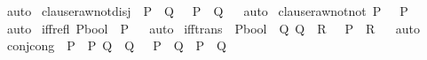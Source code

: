 \begin{isabellebody}
\ auto%
\endisatagproof
{\isafoldproof}%
%
\isadelimproof
%
\endisadelimproof
\isanewline
{}\isamarkupfalse%
\ clause{}raw{\isacharunderscore}{\kern0pt}not{\isacharunderscore}{\kern0pt}disj{\isacharcolon}{\kern0pt}\ {\isachardoublequoteopen}{\isasymlbrakk}{\isasymnot}\ P{\isacharsemicolon}{\kern0pt}\ {\isasymnot}\ Q{\isasymrbrakk}\ {\isasymLongrightarrow}\ {\isasymnot}\ {\isacharparenleft}{\kern0pt}P\ {\isasymor}\ Q{\isacharparenright}{\kern0pt}{\isachardoublequoteclose}%
\isadelimproof
\ %
\endisadelimproof
%
\isatagproof
{}\isamarkupfalse%
\ auto%
\endisatagproof
{\isafoldproof}%
%
\isadelimproof
%
\endisadelimproof
\isanewline
{}\isamarkupfalse%
\ clause{}raw{\isacharunderscore}{\kern0pt}not{\isacharunderscore}{\kern0pt}not{\isacharcolon}{\kern0pt}\ {\isachardoublequoteopen}P\ {\isasymLongrightarrow}\ {\isasymnot}{\isasymnot}\ P{\isachardoublequoteclose}%
\isadelimproof
\ %
\endisadelimproof
%
\isatagproof
{}\isamarkupfalse%
\ auto%
\endisatagproof
{\isafoldproof}%
%
\isadelimproof
%
\endisadelimproof
\isanewline
\isanewline
{}\isamarkupfalse%
\ iff{\isacharunderscore}{\kern0pt}refl{\isacharcolon}{\kern0pt}\ {\isachardoublequoteopen}{\isacharparenleft}{\kern0pt}P{\isacharcolon}{\kern0pt}{\isacharcolon}{\kern0pt}bool{\isacharparenright}{\kern0pt}\ {\isacharequal}{\kern0pt}\ P{\isachardoublequoteclose}%
\isadelimproof
\ %
\endisadelimproof
%
\isatagproof
{}\isamarkupfalse%
\ auto%
\endisatagproof
{\isafoldproof}%
%
\isadelimproof
%
\endisadelimproof
\isanewline
{}\isamarkupfalse%
\ iff{\isacharunderscore}{\kern0pt}trans{\isacharcolon}{\kern0pt}\ {\isachardoublequoteopen}{\isacharbrackleft}{\kern0pt}{\isacharbar}{\kern0pt}\ {\isacharparenleft}{\kern0pt}P{\isacharcolon}{\kern0pt}{\isacharcolon}{\kern0pt}bool{\isacharparenright}{\kern0pt}\ {\isacharequal}{\kern0pt}\ Q{\isacharsemicolon}{\kern0pt}\ Q\ {\isacharequal}{\kern0pt}\ R\ {\isacharbar}{\kern0pt}{\isacharbrackright}{\kern0pt}\ {\isacharequal}{\kern0pt}{\isacharequal}{\kern0pt}{\isachargreater}{\kern0pt}\ P\ {\isacharequal}{\kern0pt}\ R{\isachardoublequoteclose}%
\isadelimproof
\ %
\endisadelimproof
%
\isatagproof
{}\isamarkupfalse%
\ auto%
\endisatagproof
{\isafoldproof}%
%
\isadelimproof
%
\endisadelimproof
\isanewline
{}\isamarkupfalse%
\ conj{\isacharunderscore}{\kern0pt}cong{\isacharcolon}{\kern0pt}\ {\isachardoublequoteopen}{\isacharbrackleft}{\kern0pt}{\isacharbar}{\kern0pt}\ P\ {\isacharequal}{\kern0pt}\ P{\isacharprime}{\kern0pt}{\isacharsemicolon}{\kern0pt}\ Q\ {\isacharequal}{\kern0pt}\ Q{\isacharprime}{\kern0pt}\ {\isacharbar}{\kern0pt}{\isacharbrackright}{\kern0pt}\ {\isacharequal}{\kern0pt}{\isacharequal}{\kern0pt}{\isachargreater}{\kern0pt}\ {\isacharparenleft}{\kern0pt}P\ {\isasymand}\ Q{\isacharparenright}{\kern0pt}\ {\isacharequal}{\kern0pt}\ {\isacharparenleft}{\kern0pt}P{\isacharprime}{\kern0pt}\ {\isasymand}\ Q{\isacharprime}{\kern0pt}{\isacharparenright}{\kern0pt}{\isachardoublequoteclose}%

\end{isabellebody}
